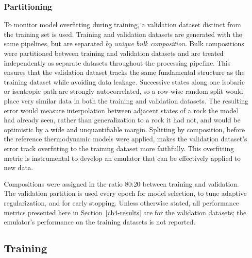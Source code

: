 
\subsubsection{Partitioning}
\label{sec:split}

To monitor model overfitting during training, a validation dataset distinct from the training set is used. Training and validation datasets are generated with the same pipelines, 
but are separated \emph{by unique bulk composition}. Bulk compositions were partitioned between training and validation datasets and are treated independently as 
separate datasets throughout the processing pipeline. This ensures that the validation dataset tracks the same fundamental structure as the training dataset while 
avoiding data leakage. Successive states along one isobaric or isentropic path are strongly autocorrelated, so a row-wise random
split would place very similar data in both the training and validation datasets. The resulting error would measure interpolation between adjacent states of a rock the
model had already seen, rather than generalization to a rock it had not, and would be
optimistic by a wide and unquantifiable margin. Splitting by composition, before the reference thermodynamic
models were applied, makes the validation dataset's error track overfitting to the training dataset more faithfully. 
This overfitting metric is instrumental to develop an emulator that can be effectively applied to new data. 

Compositions were assigned in the ratio 80:20 between training and validation. 
The validation partition is used every epoch for model selection, to tune adaptive regularization, and for early stopping. 
Unless otherwise stated, all performance metrics presented here in Section~\ref{ch4-results} are for the validation datasets; the emulator's performance on the training datasets is not reported. 



\subsection{Training}\label{ch4-training}

